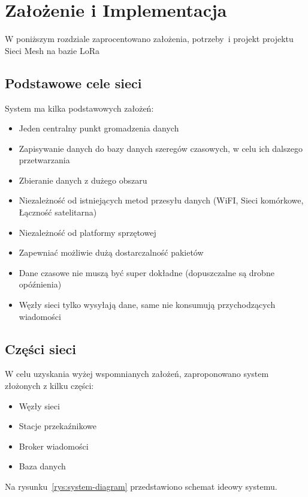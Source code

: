 \chapter{Założenie i Implementacja}
W poniższym rozdziale zaprocentowano założenia, potrzeby~i projekt projektu Sieci Mesh na bazie LoRa

\section{Podstawowe cele sieci}
System ma kilka podstawowych założeń:
\begin{itemize}
    \item Jeden centralny punkt gromadzenia danych
    \item Zapisywanie danych do bazy danych szeregów czasowych, w celu ich dalszego przetwarzania
    \item Zbieranie danych z dużego obszaru
    \item Niezależność od istniejących metod przesyłu danych (WiFI, Sieci komórkowe, Łączność satelitarna)
    \item Niezależność od platformy sprzętowej
    \item Zapewniać możliwie dużą dostarczalność pakietów
    \item Dane czasowe nie muszą być super dokładne (dopuszczalne są drobne opóźnienia)
    \item Węzły sieci tylko wysyłają dane, same nie konsumują przychodzących wiadomości
\end{itemize}

\section{Części sieci}
W celu uzyskania wyżej wspomnianych założeń, zaproponowano system złożonych z kilku części:
\begin{itemize}
    \item Węzły sieci
    \item Stacje przekaźnikowe
    \item Broker wiadomości
    \item Baza danych
\end{itemize}
Na rysunku~\ref{rys:system-diagram} przedstawiono schemat ideowy systemu.

